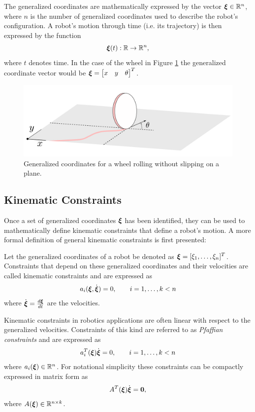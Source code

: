 The generalized coordinates are mathematically expressed by the vector $\bm{\xi} \in \mathbb{R}^n$, where $n$ is the number of generalized coordinates used to describe the robot's configuration.
A robot's motion through time (i.e. its trajectory) is then expressed by the function
\begin{equation*}
    \bm{\xi}(t): \mathbb{R} \to \mathbb{R}^n,
\end{equation*}
where $t$ denotes time. In the case of the wheel in Figure \ref{fig:non slip disk} the generalized coordinate vector would be $\bm{\xi} = \begin{bmatrix} x & y & \theta \end{bmatrix}^T$.

\begin{figure}[ht] 
    \centering 
    \includegraphics[width=0.65\linewidth]{tex/figs/ch01_figs/wheel_roll.png}
    \caption{Generalized coordinates for a wheel rolling without slipping on a plane.} 
    \label{fig:non slip disk} 
\end{figure} 

\subsection{Kinematic Constraints}
Once a set of generalized coordinates $\bm{\xi}$ has been identified, they can be used to mathematically define kinematic constraints that define a robot's motion. A more formal definition of general kinematic constraints is first presented:

\begin{definition}
Let the generalized coordinates of a robot be denoted as $\bm{\xi} =[\xi_1, \dots, \xi_n]^T $. Constraints that depend on these generalized coordinates and their velocities are called kinematic constraints and are expressed as
\begin{equation} \label{eq:kinconst}
    a_i(\bm{\xi}, \dot{\bm{\xi}}) = 0, \quad \quad i = 1, \dots, k < n
\end{equation}
where $\dot{\bm{\xi}} = \frac{d\bm{\xi}}{dt}$ are the velocities.
\end{definition}

Kinematic constraints in robotics applications are often linear with respect to the generalized velocities. Constraints of this kind are referred to as \textit{Pfaffian constraints} and are expressed as
\begin{equation} \label{eq:pfaffian}
    a_i^T(\bm{\xi})\dot{\bm{\xi}} = 0, \quad \quad i =1, \dots, k < n
\end{equation}
where $a_i(\bm{\xi}) \in \mathbb{R}^n$. For notational simplicity these constraints can be compactly expressed in matrix form as
\begin{equation}
    A^T(\bm{\xi})\dot{\bm{\xi}}=\bm{0},
\end{equation}
where $A(\bm{\xi}) \in \mathbb{R}^{n \times k}$.


